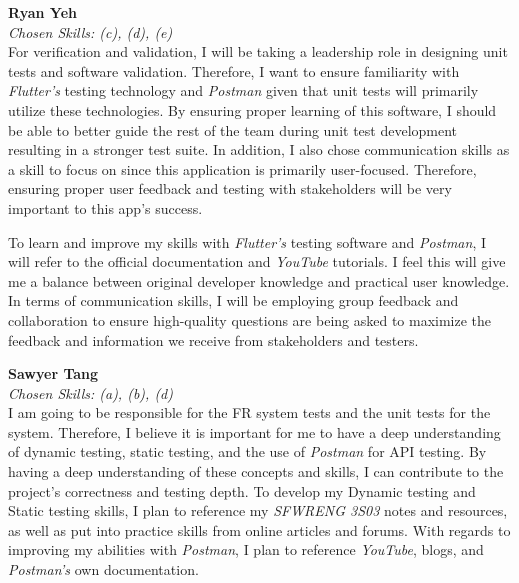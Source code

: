 \documentclass[12pt, titlepage]{article}
\begin{document}
\begin{enumerate}
  \textbf{Ryan Yeh}\\
  \textit{Chosen Skills: (c), (d), (e)} \\
  For verification and validation, I will be taking a leadership role in designing unit tests and software
  validation. Therefore, I want to ensure familiarity with \textit{Flutter's} testing technology and \textit{Postman}
  given that unit tests will primarily utilize these technologies. By ensuring proper learning of
  this software, I should be able to better guide the rest of the team during unit test development resulting
  in a stronger test suite. In addition, I also chose communication skills as a skill to focus on since this application
  is primarily user-focused. Therefore, ensuring proper user feedback and testing with stakeholders will be very important
  to this app's success. \par
  To learn and improve my skills with \textit{Flutter's} testing software and \textit{Postman}, I will refer to the
  official documentation and \textit{YouTube} tutorials. I feel this will give me a balance between original developer
  knowledge and practical user knowledge. In terms of communication skills, I will be employing group feedback
  and collaboration to ensure high-quality questions are being asked to maximize the feedback and information we receive
  from stakeholders and testers.

  \medskip
  \textbf{Sawyer Tang}\\
  \textit{Chosen Skills: (a), (b), (d)} \\
  I am going to be responsible for the FR system tests and the unit tests for the system. Therefore, I believe it is important for me to have a deep understanding of dynamic testing, static testing, and the use of \textit{Postman} for API testing. By having a deep understanding of these concepts and skills, I can contribute to the project's correctness and testing depth.
  To develop my Dynamic testing and Static testing skills, I plan to reference my \textit{SFWRENG 3S03} notes and resources, as well as put into practice skills from online articles and forums. With regards to improving my abilities with \textit{Postman}, I plan to reference \textit{YouTube}, blogs, and \textit{Postman's} own documentation.


\end{enumerate}
\end{document}
